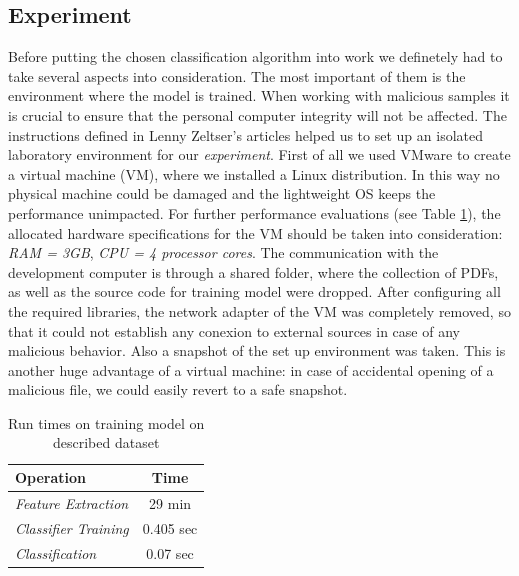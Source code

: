 \subsection{Experiment}
Before putting the chosen classification algorithm into work we definetely had to take several aspects into consideration. The most important of them is the environment where the model is trained. When working with malicious samples it is crucial to ensure that the personal computer integrity will not be affected. The instructions defined in Lenny Zeltser's articles \cite{zeltser} helped us to set up an isolated laboratory environment for our \textit{experiment}. First of all we used VMware to create a virtual machine (VM), where we installed a Linux distribution. In this way no physical machine could be damaged and the lightweight OS keeps the performance unimpacted. For further performance evaluations (see Table \ref{table:performance}), the allocated hardware specifications for the VM should be taken into consideration: \textit{RAM = 3GB}, \textit{CPU = 4 processor cores}. The communication with the development computer is through a shared folder, where the collection of PDFs, as well as the source code for training model were dropped. After configuring all the required libraries, the network adapter of the VM was completely removed, so that it could not establish any conexion to external sources in case of any malicious behavior. Also a snapshot of the set up environment was taken. This is another huge advantage of a virtual machine: in case of accidental opening of a malicious file, we could easily revert to a safe snapshot. \par 

\begin{table}[H]
	\caption{Run times on training model on described dataset}
	\label{table:performance}
        \centering
            \begin{tabular}{p{5cm} c}
                \toprule
                
				\textbf{Operation} & \textbf{Time} \\
				\hline 
				\textit{Feature Extraction} & 29 min \\
				\hline 
				\textit{Classifier Training} & 0.405 sec \\
				\hline
				\textit{Classification} & 0.07 sec \\

                \bottomrule
			\end{tabular}
\end{table}


